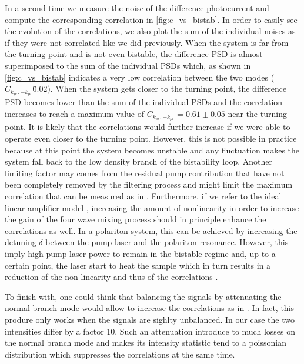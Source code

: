 In a second time we measure the noise of the difference photocurrent and compute the corresponding correlation in \autoref{fig:c_vs_bistab}. In order to easily see the evolution of the correlations, we also plot the sum of the individual noises as if they were not correlated like we did previously. When the system is far from the turning point and is not even bistable, the difference PSD is almost superimposed to the sum of the individual PSDs which, as shown in \autoref{fig:c_vs_bistab} indicates a very low correlation between the two modes ($C_{k_{pr},-k_{pr}}$\~0.02).
When the system gets closer to the turning point, the difference PSD becomes lower than the sum of the individual PSDs and the correlation increases to reach a maximum value of $C_{k_{pr},-k_{pr}}=0.61\pm0.05$ near the turning point. It is likely that the correlations would further increase if we were able to operate even closer to the turning point. However, this is not possible in practice because at this point the system becomes
unstable and any fluctuation makes the system fall back to the low density branch of the bistability loop. Another limiting factor may comes from the residual pump contribution that have not been completely removed by the filtering process and might limit the maximum correlation that can be measured as in \cite{glorieux_etude_nodate}. Furthermore, if we refer 
to the ideal linear amplifier model \cite{boyd_nl_optics}, increasing the amount of nonlinearity in order to increase the gain of the four wave mixing process should in principle enhance the correlations as well. In a polariton
system, this can be achieved by increasing the detuning $\delta$ between the pump laser and the polariton resonance. However, this imply high pump laser power to remain in the bistable regime and, up to a certain point, the laser start to heat the sample which in turn results in a reduction of the non linearity and thus of the correlations \cite{romanelli_4wm_2007}.


To finish with, one could think that balancing the signals by attenuating the normal branch mode would allow to increase the correlations as in \cite{romanelli_4wm_2007}. In fact, this produre only works when the signals are sighlty unbalanced. In our case the two intensities differ by a factor 10. Such an attenuation
introduce to much losses on the normal branch mode and makes its intensity statistic tend to a poissonian distribution which suppresses the correlations at the same time.





